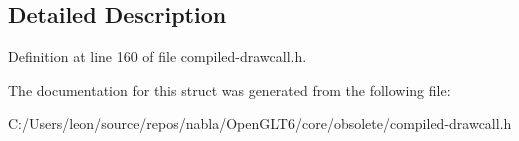 \subsection{Detailed Description}


Definition at line 160 of file compiled-\/drawcall.\+h.



The documentation for this struct was generated from the following file\+:\begin{DoxyCompactItemize}
\item 
C\+:/\+Users/leon/source/repos/nabla/\+Open\+G\+L\+T6/core/obsolete/compiled-\/drawcall.\+h\end{DoxyCompactItemize}

